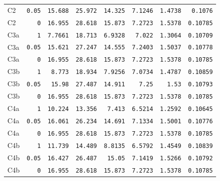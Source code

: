 \begin{longtable}{lrrrrrrr}
C2 & \texttt{0.05} & \texttt{15.688} & \texttt{25.972} & \texttt{14.325} & \texttt{7.1246} & \texttt{1.4738} & \texttt{0.1076} \\
C2 & \texttt{0} & \texttt{16.955} & \texttt{28.618} & \texttt{15.873} & \texttt{7.2723} & \texttt{1.5378} & \texttt{0.10785} \\
C3a & \texttt{1} & \texttt{7.7661} & \texttt{18.713} & \texttt{6.9328} & \texttt{7.022} & \texttt{1.3064} & \texttt{0.10709} \\
C3a & \texttt{0.05} & \texttt{15.621} & \texttt{27.247} & \texttt{14.555} & \texttt{7.2403} & \texttt{1.5037} & \texttt{0.10778} \\
C3a & \texttt{0} & \texttt{16.955} & \texttt{28.618} & \texttt{15.873} & \texttt{7.2723} & \texttt{1.5378} & \texttt{0.10785} \\
C3b & \texttt{1} & \texttt{8.773} & \texttt{18.934} & \texttt{7.9256} & \texttt{7.0734} & \texttt{1.4787} & \texttt{0.10859} \\
C3b & \texttt{0.05} & \texttt{15.98} & \texttt{27.487} & \texttt{14.911} & \texttt{7.25} & \texttt{1.53} & \texttt{0.10793} \\
C3b & \texttt{0} & \texttt{16.955} & \texttt{28.618} & \texttt{15.873} & \texttt{7.2723} & \texttt{1.5378} & \texttt{0.10785} \\
C4a & \texttt{1} & \texttt{10.224} & \texttt{13.356} & \texttt{7.413} & \texttt{6.5214} & \texttt{1.2592} & \texttt{0.10645} \\
C4a & \texttt{0.05} & \texttt{16.061} & \texttt{26.234} & \texttt{14.691} & \texttt{7.1334} & \texttt{1.5001} & \texttt{0.10776} \\
C4a & \texttt{0} & \texttt{16.955} & \texttt{28.618} & \texttt{15.873} & \texttt{7.2723} & \texttt{1.5378} & \texttt{0.10785} \\
C4b & \texttt{1} & \texttt{11.739} & \texttt{14.489} & \texttt{8.8135} & \texttt{6.5792} & \texttt{1.4549} & \texttt{0.10839} \\
C4b & \texttt{0.05} & \texttt{16.427} & \texttt{26.487} & \texttt{15.05} & \texttt{7.1419} & \texttt{1.5266} & \texttt{0.10792} \\
C4b & \texttt{0} & \texttt{16.955} & \texttt{28.618} & \texttt{15.873} & \texttt{7.2723} & \texttt{1.5378} & \texttt{0.10785} \\
\end{longtable}
\endgroup


